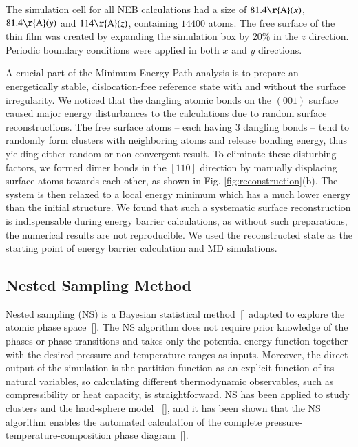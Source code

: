 \documentclass[review]{elsarticle}
\begin{document}
The simulation cell for all NEB calculations had a size of $81.4{\rm \r{A}} (x)$, $81.4{\rm \r{A}} (y)$ and $114{\rm \r{A}} (z)$, containing $14400$ atoms. The free surface of the thin film was created by expanding the simulation box by $20\%$ in the $z$ direction. Periodic boundary conditions were applied in both $x$ and $y$ directions. 

A crucial part of the Minimum Energy Path analysis is to prepare an energetically stable, dislocation-free reference state with and without the surface irregularity. We noticed that the dangling atomic bonds on the $(001)$ surface caused major energy disturbances to the calculations due to random surface reconstructions. The free surface atoms -- each having $3$ dangling bonds -- tend to randomly form clusters with neighboring atoms and release bonding energy, thus yielding either random or non-convergent result. To eliminate these disturbing factors, we formed dimer bonds in the $[110]$ direction by manually displacing surface atoms towards each other, as shown in Fig. \ref{fig:reconstruction}(b). The system is then relaxed to a local energy minimum which has a much lower energy than the initial structure.  We found that such a systematic surface reconstruction is indispensable during energy barrier calculations, as without such preparations, the numerical results are not reproducible. We used the reconstructed state as the starting point of energy barrier calculation and MD simulations. 


\subsection{Nested Sampling Method}\label{sec:ns}

Nested sampling (NS) is a Bayesian statistical method~[\cite{bib:skilling,bib:skilling2}] adapted to explore the atomic phase space~[\cite{our_NS_paper}].
The NS algorithm does not require prior knowledge of the phases or phase transitions and takes only the potential energy function together with the desired pressure and temperature ranges as inputs. 
Moreover, the direct output of the simulation is the partition function as an explicit function of its natural variables, so calculating different thermodynamic observables, such as compressibility or heat capacity, is straightforward.
NS has been applied to study clusters and the hard-sphere model ~[\cite{our_NSHS_paper, diffns,Frenkel_NS}], and it has been shown that the NS algorithm enables the automated calculation of the complete pressure-temperature-composition phase diagram~[\cite{pt_phase_dias_ns,pymatnest_paper}].
\end{document}
